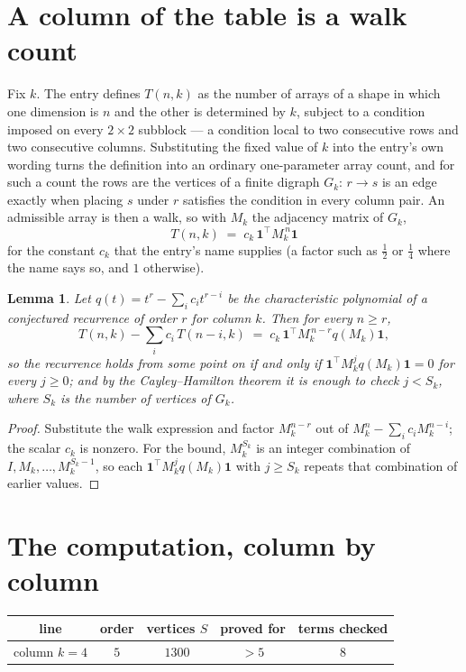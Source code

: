 \documentclass[11pt,a4paper]{article}
\theoremstyle{plain}
\newtheorem{lemma}[theorem]{Lemma}
\theoremstyle{definition}
\begin{document}
\section{A column of the table is a walk count}

Fix $k$. The entry defines $T(n,k)$ as the number of arrays of a shape in which one dimension
is $n$ and the other is determined by $k$, subject to a condition imposed on every
$2\times2$ subblock --- a condition local to two consecutive rows and two consecutive columns.
Substituting the fixed value of $k$ into the entry's own wording turns the definition into an
ordinary one-parameter array count, and for such a count the rows are the vertices of a finite
digraph $G_k$: $r\to s$ is an edge exactly when placing $s$ under $r$ satisfies the condition
in every column pair. An admissible array is then a walk, so with $M_k$ the adjacency matrix
of $G_k$,
\[
T(n,k)\;=\;c_k\,\mathbf{1}^{\!\top}M_k^{\,n}\mathbf{1}
\]
for the constant $c_k$ that the entry's name supplies (a factor such as $\tfrac12$ or
$\tfrac14$ where the name says so, and $1$ otherwise).

\begin{lemma}\label{lem:crit}
Let $q(t)=t^{r}-\sum_i c_it^{r-i}$ be the characteristic polynomial of a conjectured
recurrence of order $r$ for column $k$. Then for every $n\ge r$,
\[
T(n,k)-\sum_i c_i\,T(n-i,k)\;=\;c_k\,\mathbf{1}^{\!\top}M_k^{\,n-r}q(M_k)\mathbf{1},
\]
so the recurrence holds from some point on if and only if
$\mathbf{1}^{\!\top}M_k^{j}q(M_k)\mathbf{1}=0$ for every $j\ge0$; and by the
Cayley--Hamilton theorem it is enough to check $j<S_k$, where $S_k$ is the number of vertices
of $G_k$.
\end{lemma}

\begin{proof}
Substitute the walk expression and factor $M_k^{n-r}$ out of $M_k^{n}-\sum_ic_iM_k^{n-i}$;
the scalar $c_k$ is nonzero. For the bound, $M_k^{S_k}$ is an integer combination of
$I,M_k,\dots,M_k^{S_k-1}$, so each $\mathbf{1}^{\!\top}M_k^{j}q(M_k)\mathbf{1}$ with
$j\ge S_k$ repeats that combination of earlier values.
\end{proof}

\section{The computation, column by column}

\begin{center}
\begin{tabular}{ccccc}
line & order & vertices $S$ & proved for & terms checked \\ \hline
column $k$$=4$ & $5$ & $1300$ & $>5$ & $8$ \\
\end{tabular}
\end{center}
\end{document}
